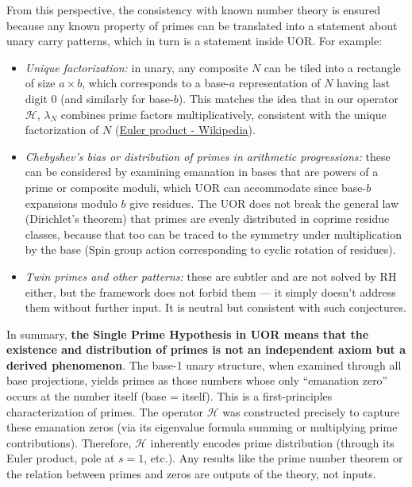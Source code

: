 \documentclass{article}
\begin{document}
From this perspective, the consistency with known number theory is ensured because any known property of primes can be translated into a statement about unary carry patterns, which in turn is a statement inside UOR. For example:
\begin{itemize}[leftmargin=*, label={--}]
\item \emph{Unique factorization:} in unary, any composite $N$ can be tiled into a rectangle of size $a \times b$, which corresponds to a base-$a$ representation of $N$ having last digit 0 (and similarly for base-$b$). This matches the idea that in our operator $\mathcal{H}$, $\lambda_N$ combines prime factors multiplicatively, consistent with the unique factorization of $N$ (\href{https://en.wikipedia.org/wiki/Euler_product#:~:text=The%20Euler%20product%20attached%20to,of%20the%20geometric%20series%2C%20is}{Euler product - Wikipedia}).
\item \emph{Chebyshev’s bias or distribution of primes in arithmetic progressions:} these can be considered by examining emanation in bases that are powers of a prime or composite moduli, which UOR can accommodate since base-$b$ expansions modulo $b$ give residues. The UOR does not break the general law (Dirichlet’s theorem) that primes are evenly distributed in coprime residue classes, because that too can be traced to the symmetry under multiplication by the base (Spin group action corresponding to cyclic rotation of residues).
\item \emph{Twin primes and other patterns:} these are subtler and are not solved by RH either, but the framework does not forbid them --- it simply doesn’t address them without further input. It is neutral but consistent with such conjectures.
\end{itemize}

In summary, \textbf{the Single Prime Hypothesis in UOR means that the existence and distribution of primes is not an independent axiom but a derived phenomenon}. The base-1 unary structure, when examined through all base projections, yields primes as those numbers whose only ``emanation zero'' occurs at the number itself (base = itself). This is a first-principles characterization of primes. The operator $\mathcal{H}$ was constructed precisely to capture these emanation zeros (via its eigenvalue formula summing or multiplying prime contributions). Therefore, $\mathcal{H}$ inherently encodes prime distribution (through its Euler product, pole at $s=1$, etc.). Any results like the prime number theorem or the relation between primes and zeros are outputs of the theory, not inputs.
\end{document}
